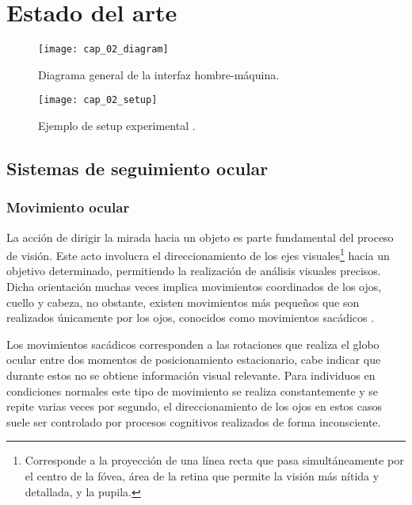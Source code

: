 \documentclass[../main.tex]{subfiles}
\begin{document}
		
\chapter{Estado del arte}
\label{cha:02_estado_del_arte}

	\begin{figure}[H]
		\centering
		\texttt{[image: cap\_02\_diagram]}
		\caption{Diagrama general de la interfaz hombre-máquina.}
		\label{fig:02_diagrama_interfaz}
	\end{figure}

	\begin{figure}[H]
		\centering
		\texttt{[image: cap\_02\_setup]}
		\caption{Ejemplo de setup experimental \cite{website:baseInfo}.}
		\label{fig:02_ejemplo_setup}
	\end{figure}

	\section{Sistemas de seguimiento ocular}
	\label{sec:02_sistemas_de_seguimiento_ocular}
		\subsection{Movimiento ocular}
		\label{sub:02_movimiento_ocular}

		La acción de dirigir la mirada hacia un objeto es parte fundamental del proceso de visión. Este acto involucra el direccionamiento de los ejes visuales\footnote{Corresponde a la proyección de una línea recta que pasa simultáneamente por el centro de la fóvea, área de la retina que permite la visión más nítida y detallada, y la pupila.} hacia un objetivo determinado, permitiendo la realización de análisis visuales precisos. Dicha orientación muchas veces implica movimientos coordinados de los ojos, cuello y cabeza, no obstante, existen movimientos más pequeños que son realizados únicamente por los ojos, conocidos como movimientos sacádicos \cite{article:movOcular, website:movOcular}.

		Los movimientos sacádicos corresponden a las rotaciones que realiza el globo ocular entre dos momentos de posicionamiento estacionario, cabe indicar que durante estos no se obtiene información visual relevante. Para individuos en condiciones normales este tipo de movimiento se realiza constantemente y se repite varias veces por segundo, el direccionamiento de los ojos en estos casos suele ser controlado por procesos cognitivos realizados de forma inconsciente.
\end{document}
